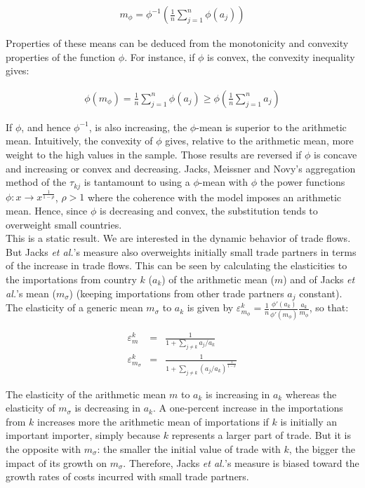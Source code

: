\documentclass{article}
\begin{document}
\begin{eqnarray*}
m_{\phi}=\phi^{-1}\left(\frac{1}{n}\sum_{j=1}^n \phi(a_j)\right)
\end{eqnarray*}

Properties of these means can be deduced from the monotonicity
and convexity properties of the function $\phi$. For instance,
if $\phi$ is convex, the convexity inequality gives:

\begin{eqnarray*}
\phi(m_{\phi})=\frac{1}{n}\sum_{j=1}^n\phi(a_j)\geq \phi\left(\frac{1}{n}\sum_{j=1}^n
a_j\right)
\end{eqnarray*}

If $\phi$, and hence $\phi^{-1}$, is also increasing, the
$\phi$-mean is superior to the arithmetic mean. Intuitively,
the convexity of $\phi$ gives, relative to the arithmetic mean,
more weight to the high values in the sample. Those results are
reversed if $\phi$ is concave and increasing or convex and
decreasing. Jacks, Meissner and Novy's aggregation method of
the $\tau_{kj}$ is tantamount to using a $\phi$-mean with
$\phi$ the power functions $\phi: x \rightarrow
x^{\frac{1}{1-\rho}}$, $\rho>1$ where the coherence with the
model imposes an arithmetic mean. Hence, since $\phi$ is
decreasing and convex, the substitution tends to overweight
small countries.\\

This is a static result. We are interested in the dynamic
behavior of trade flows. But Jacks \textit{et al.}'s measure also
overweights initially small trade partners in terms of the
increase in trade flows. This can be seen by calculating the
elasticities to the importations from country $k$ ($a_k$) of
the arithmetic mean ($m$) and of Jacks \textit{et al.}'s mean
($m_{\sigma}$) (keeping importations from other trade partners
$a_j$ constant). The elasticity of a generic mean $m_\sigma$ to
$a_k$ is given by
\mbox{$\varepsilon_{m_{\phi}}^k=\frac{1}{n}\frac{\phi'(a_k)}{\phi'(m_{\phi})}\frac{a_k}{m_{\phi}}$},
so that:

\begin{eqnarray*}
\varepsilon_m^k&=& \frac{1}{1+\sum\limits_{j \neq k} a_j/a_k}\\
\varepsilon_{m_{\sigma}}^k&=&\frac{1}{1+\sum\limits_{j\neq k} (a_j/a_k)^{\frac{1}{1-\sigma}}}
\end{eqnarray*}

The elasticity of the arithmetic mean $m$ to $a_k$ is
increasing in $a_k$ whereas the elasticity of $m_{\sigma}$ is
decreasing in $a_k$. A one-percent increase in the importations
from $k$ increases more the arithmetic mean of importations if
$k$ is initially an important importer, simply because $k$
represents a larger part of trade. But it is the opposite with
$m_{\sigma}$: the smaller the initial value of trade with $k$,
the bigger the impact of its growth on $m_{\sigma}$. Therefore,
Jacks \textit{et al.}'s measure is biased toward the growth rates of
costs incurred with small trade partners.



\end{document}
